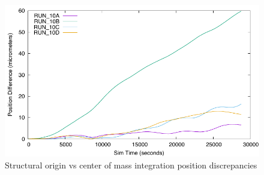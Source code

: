 \begin{figure}[hbtp]
\centering
\includegraphics{SIM_dyncomp_compare.pdf}
\caption{Structural origin vs center of mass integration position discrepancies}
\label{fig:SIM_dyncomp_RUN_10_discrepancies}
\end{figure}
